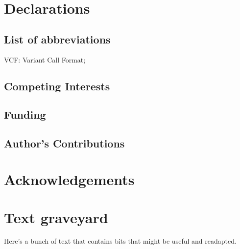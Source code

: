 \documentclass[a4paper,num-refs]{oup-contemporary}
\begin{document}
\section{Declarations}

\subsection{List of abbreviations}

VCF: Variant Call Format;

\subsection{Competing Interests}

\subsection{Funding}

\subsection{Author's Contributions}

\section{Acknowledgements}








\clearpage
\section*{Text graveyard}

Here's a bunch of text that contains bits that might be useful and readapted.
\end{document}
